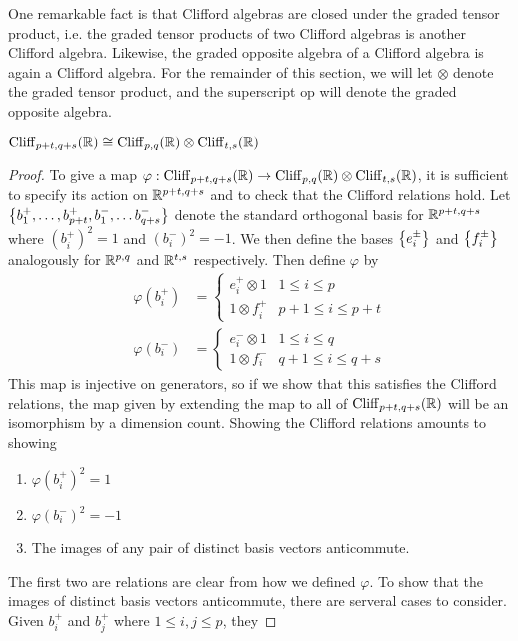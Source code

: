 One remarkable fact is that Clifford algebras are closed under the graded
tensor product, i.e. the graded tensor products of two Clifford algebras is
another Clifford algebra. Likewise, the graded opposite algebra of a Clifford
algebra is again a Clifford algebra. For the remainder of this section,
we will let $\otimes$ denote the graded tensor product, and the superscript
$\text{op}$ will denote the graded opposite algebra.
%
\begin{thm}
$\operatorname{Cliff}_{p+t,q+s}(\mathbb{R}) \cong \operatorname{Cliff}_{p,q}(\mathbb{R}) \otimes \operatorname{Cliff}_{t,s}(\mathbb{R})$
\end{thm}
%
\begin{proof}
To give a map $\varphi : \operatorname{Cliff}_{p+t,q+s}(\mathbb{R}) \to \operatorname{Cliff}_{p,q}(\mathbb{R}) \otimes
\operatorname{Cliff}_{t,s}(\mathbb{R})$, it is sufficient to specify its action on $\mathbb{R}^{p+t,q+s}$ and
to check that the Clifford relations hold. Let
$\left\lbrace b_1^+,\ldots, b_{p+t}^+, b_1^-, \ldots b_{q+s}^- \right\rbrace$ denote the standard
orthogonal basis for $\mathbb{R}^{p+t,q+s}$ where $(b_i^+)^2 = 1$ and $(b_i^-)^2 = -1$.
We then define the bases $\left\lbrace e_i^\pm \right\rbrace$ and $\left\lbrace f_i^\pm \right\rbrace$ analogously for
$\mathbb{R}^{p,q}$ and $\mathbb{R}^{t,s}$ respectively. Then define $\varphi$ by
%
\begin{align*}
\varphi(b_i^+) &= \begin{cases}
e_i^+ \otimes 1 & 1 \leq i \leq p \\
1 \otimes f_i^+ & p+1 \leq i \leq p+t
\end{cases} \\
\varphi(b_i^-) &= \begin{cases}
e_i^- \otimes 1 & 1 \leq i \leq q \\
1 \otimes f_i^- & q+1 \leq i \leq q+s
\end{cases}
\end{align*}
%
This map is injective on generators, so if we show that this satisfies the
Clifford relations, the map given by extending the map to all of
$\operatorname{Cliff}_{p+t,q+s}(\mathbb{R})$ will be an isomorphism by a dimension count. Showing
the Clifford relations amounts to showing
%
\begin{enumerate}
  \item $\varphi(b_i^+)^2 = 1$
  \item $\varphi(b_i^-)^2 = -1$
  \item The images of any pair of distinct basis vectors anticommute.
\end{enumerate}
%
The first two are relations are clear from how we defined $\varphi$. To show
that the images of distinct basis vectors anticommute, there are serveral
cases to consider. Given $b_i^+$ and $b_j^+$ where $1 \leq i,j \leq p$, they

\end{proof}
